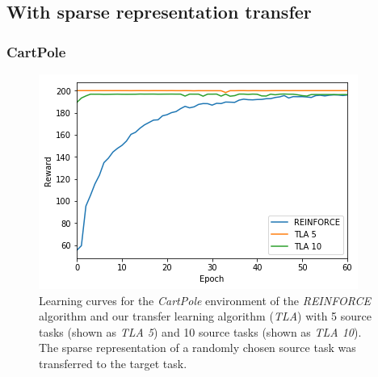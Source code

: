 
\subsection{With sparse representation transfer} %
\label{sub:cartpole:with_sparse_representation_transfer}
\subsubsection{CartPole} %
\label{ssub:with_sparse_representation_transfer:cartpole}
\begin{figure}[H]
    \centering
    \includegraphics[width=.8\linewidth]{images/results/CartPole/sparse_transfer/reward_target_re-akt5-akt10.png}
    \caption[Learning curves for the \textit{CartPole} environment of \textit{REINFORCE} and \textit{TLA} using sparse representation transfer]{Learning curves for the \emph{CartPole} environment of the \textit{REINFORCE} algorithm and our transfer learning algorithm (\textit{TLA}) with 5 source tasks (shown as \textit{TLA 5}) and 10 source tasks (shown as \textit{TLA 10}). The sparse representation of a randomly chosen source task was transferred to the target task.}
    \label{fig:CartPole:st:reward_target_re-akt5-akt10}
\end{figure}
